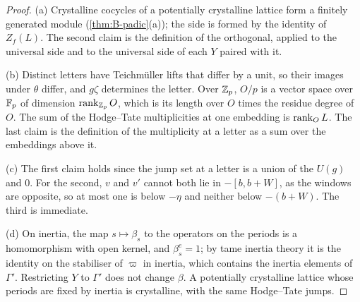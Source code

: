 \begin{proof}
(a) Crystalline cocycles of a potentially crystalline lattice form a finitely generated module (\cref{thm:B-padic}(a)); the side is formed by the identity of $Z_f(L)$. The second claim is the definition of the orthogonal, applied to the universal side and to the universal side of each $Y$ paired with it.

(b) Distinct letters have Teichm\"uller lifts that differ by a unit, so their images under $\theta$ differ, and $g\zeta$ determines the letter. Over $\mathbb{Z}_p$, $O/p$ is a vector space over $\mathbb{F}_p$ of dimension $\operatorname{rank}_{\mathbb{Z}_p}O$, which is its length over $O$ times the residue degree of $O$. The sum of the Hodge--Tate multiplicities at one embedding is
$\operatorname{rank}_OL$. The last claim is the definition of the multiplicity at a letter as a sum over the embeddings above it.

(c) The first claim holds since the jump set at a letter is a union of the $U(g)$ and $0$. For the second, $v$ and $v'$ cannot both lie in $-[b,b+W]$, as the windows are opposite, so at most one is below $-\eta$ and neither below $-(b+W)$. The third is immediate.

(d) On inertia, the map $s\mapsto\beta_s$ to the operators on the periods is a homomorphism with open kernel, and $\beta_s^e=1$; by tame inertia theory it is the identity on the stabiliser of $\varpi$ in inertia, which contains the inertia elements of $\Gamma'$. Restricting $Y$ to $\Gamma'$ does not change $\beta$. A potentially crystalline lattice whose periods are fixed by inertia is
crystalline, with the same Hodge--Tate jumps.
\end{proof}

